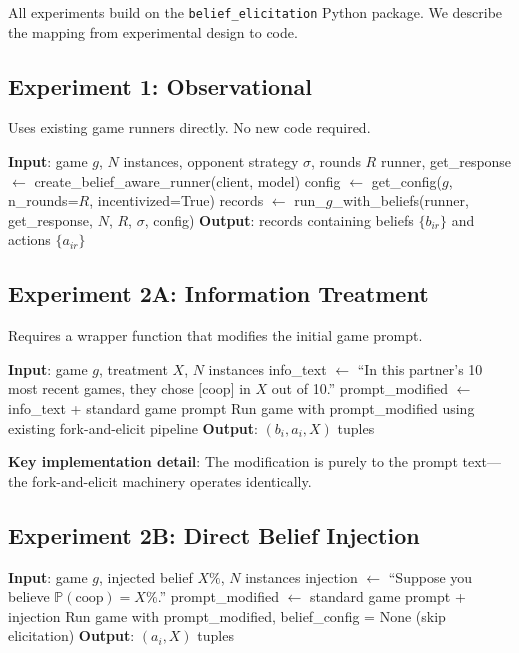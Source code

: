 \documentclass[12pt]{article}
\newcommand{\Prob}{\mathbb{P}}
\begin{document}
All experiments build on the \texttt{belief\_elicitation} Python package. We describe the mapping from experimental design to code.

\subsection{Experiment 1: Observational}

Uses existing game runners directly. No new code required.

\begin{algorithmic}[1]
\STATE \textbf{Input}: game $g$, $N$ instances, opponent strategy $\sigma$, rounds $R$
\STATE runner, get\_response $\leftarrow$ create\_belief\_aware\_runner(client, model)
\STATE config $\leftarrow$ get\_config($g$, n\_rounds=$R$, incentivized=True)
\STATE records $\leftarrow$ run\_$g$\_with\_beliefs(runner, get\_response, $N$, $R$, $\sigma$, config)
\STATE \textbf{Output}: records containing beliefs $\{b_{ir}\}$ and actions $\{a_{ir}\}$
\end{algorithmic}

\subsection{Experiment 2A: Information Treatment}

Requires a wrapper function that modifies the initial game prompt.

\begin{algorithmic}[1]
\STATE \textbf{Input}: game $g$, treatment $X$, $N$ instances
\STATE info\_text $\leftarrow$ ``In this partner's 10 most recent games, they chose [coop] in $X$ out of 10.''
\STATE prompt\_modified $\leftarrow$ info\_text + standard game prompt
\STATE Run game with prompt\_modified using existing fork-and-elicit pipeline
\STATE \textbf{Output}: $(b_i, a_i, X)$ tuples
\end{algorithmic}

\textbf{Key implementation detail}: The modification is purely to the prompt text---the fork-and-elicit machinery operates identically.

\subsection{Experiment 2B: Direct Belief Injection}

\begin{algorithmic}[1]
\STATE \textbf{Input}: game $g$, injected belief $X\%$, $N$ instances
\STATE injection $\leftarrow$ ``Suppose you believe $\Prob(\text{coop}) = X\%$.''
\STATE prompt\_modified $\leftarrow$ standard game prompt + injection
\STATE Run game with prompt\_modified, belief\_config = None (skip elicitation)
\STATE \textbf{Output}: $(a_i, X)$ tuples
\end{algorithmic}
\end{document}
